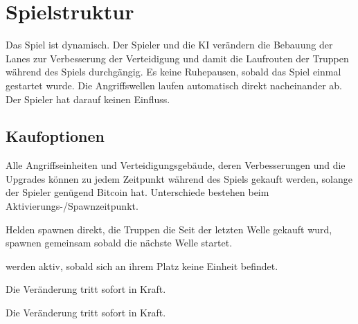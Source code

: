 \section{Spielstruktur}

%
%
%
%

Das Spiel ist dynamisch. Der Spieler und die KI verändern die Bebauung der
Lanes zur Verbesserung der Verteidigung und damit die Laufrouten der Truppen
während des Spiels durchgängig. Es keine Ruhepausen, sobald das Spiel einmal
gestartet wurde. Die Angriffswellen laufen automatisch direkt nacheinander ab.
Der Spieler hat darauf keinen Einfluss.

\subsection{Kaufoptionen}
\label{subsec:kaufoptionen}
    Alle Angriffseinheiten und Verteidigungsgebäude, deren Verbesserungen und
    die Upgrades können zu jedem Zeitpunkt während des Spiels gekauft werden, 
    solange der Spieler genügend Bitcoin hat. Unterschiede bestehen beim 
    Aktivierungs-/Spawnzeitpunkt.

  \begin{description}[noitemsep]
    \item[Angriffseinheiten] Helden spawnen direkt, die Truppen die Seit der
      letzten Welle gekauft wurd, spawnen gemeinsam sobald die nächste Welle
      startet.
    \item[Verteidigungsgebäude] werden aktiv, sobald sich an ihrem Platz keine
      Einheit befindet.
		\item[Verbesserungen] Die Veränderung tritt sofort in Kraft.
		\item[Upgrades] Die Veränderung tritt sofort in Kraft.
	\end{description}

